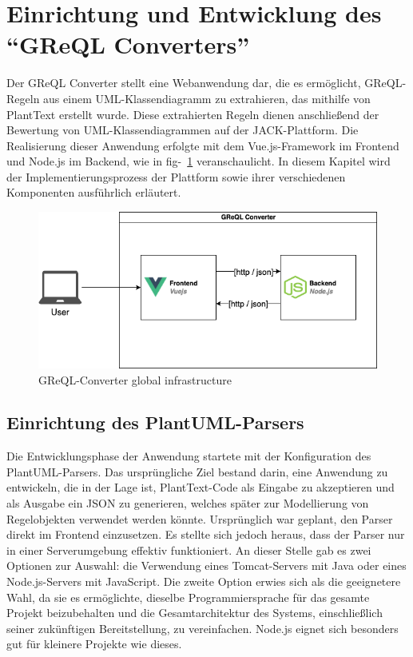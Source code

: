 \section{Einrichtung und Entwicklung des ``\gls{GReQL Converter}s''}\label{sec:greql-converter}

Der \gls{GReQL Converter} stellt eine Webanwendung dar, die es ermöglicht, GReQL-Regeln aus einem UML-Klassendiagramm zu
extrahieren, das mithilfe von PlantText erstellt wurde. Diese extrahierten Regeln dienen anschließend der Bewertung
von UML-Klassendiagrammen auf der JACK-Plattform. Die Realisierung dieser Anwendung erfolgte mit dem Vue.js-Framework
im Frontend und Node.js im Backend, wie in fig-~\ref{fig:infrastructure} veranschaulicht. In diesem Kapitel wird der
Implementierungsprozess der Plattform sowie ihrer verschiedenen Komponenten ausführlich erläutert.

\begin{figure}[h]
    \centering
    \includegraphics[width=15cm]{images/infrastucture}
    \caption{GReQL-Converter global infrastructure}
    \label{fig:infrastructure}
\end{figure}

\subsection{Einrichtung des PlantUML-Parsers}\label{subsec:einrichtung-des-plantuml-parsers}

Die Entwicklungsphase der Anwendung startete mit der Konfiguration des PlantUML-Parsers. Das ursprüngliche Ziel bestand
darin, eine Anwendung zu entwickeln, die in der Lage ist, PlantText-Code als Eingabe zu akzeptieren und als Ausgabe ein
JSON zu generieren, welches später zur Modellierung von Regelobjekten verwendet werden könnte. Ursprünglich war geplant,
den Parser direkt im Frontend einzusetzen. Es stellte sich jedoch heraus, dass der Parser nur in einer Serverumgebung
effektiv funktioniert. An dieser Stelle gab es zwei Optionen zur Auswahl: die Verwendung eines Tomcat-Servers mit Java
oder eines Node.js-Servers mit JavaScript. Die zweite Option erwies sich als die geeignetere Wahl, da sie es ermöglichte,
dieselbe Programmiersprache für das gesamte Projekt beizubehalten und die Gesamtarchitektur des Systems, einschließlich
seiner zukünftigen Bereitstellung, zu vereinfachen. Node.js eignet sich besonders gut für kleinere Projekte wie dieses.

